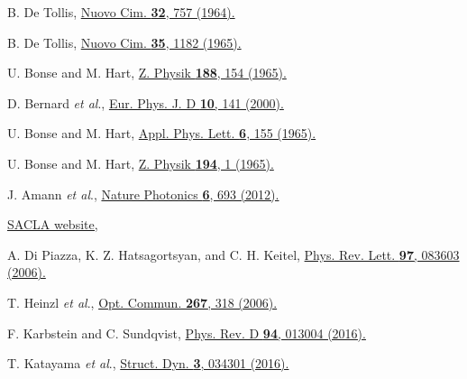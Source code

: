 \documentclass[10pt,a4paper]{article}%
\begin{document}
\begin{thebibliography}{999}
B. De Tollis,
\href{https://doi.org/10.1007/BF02735895}
{Nuovo Cim. {\bf 32}, 757 (1964).}

B. De Tollis,
\href{https://doi.org/10.1007/BF02735534}
{Nuovo Cim. {\bf 35}, 1182 (1965).}

U. Bonse and M. Hart,
\href{https://doi.org/10.1007/BF01339402}
{Z. Physik {\bf 188}, 154 (1965).}

D. Bernard {\it et al}.,
\href{http://doi.org/10.1007/s100530050535}
{Eur. Phys. J. D {\bf 10}, 141 (2000).}

U. Bonse and M. Hart,
\href{https://doi.org/10.1063/1.1754212}
{Appl. Phys. Lett. {\bf 6}, 155 (1965).}

U. Bonse and M. Hart,
\href{https://doi.org/10.1007/BF01326517}
{Z. Physik {\bf 194}, 1 (1965).}

J. Amann {\it et al}.,
\href{https://doi.org/10.1038/nphoton.2012.180}
{Nature Photonics {\bf 6}, 693 (2012).}

\href{http://xfel.riken.jp/eng/index.html}
{SACLA website,}

A. Di Piazza, K. Z. Hatsagortsyan, and C. H. Keitel,
\href{https://doi.org/10.1103/PhysRevLett.97.083603}
{Phys. Rev. Lett. {\bf 97}, 083603 (2006).}

T. Heinzl {\it et al}.,
\href{https://doi.org/10.1016/j.optcom.2006.06.053}
{Opt. Commun. {\bf 267}, 318 (2006).}

F. Karbstein and C. Sundqvist,
\href{https://doi.org/10.1103/PhysRevD.94.013004}
{Phys. Rev. D {\bf 94}, 013004 (2016).}

T. Katayama {\it et al}.,
\href{http://doi.org/10.1063/1.4939655}
{Struct. Dyn. {\bf 3}, 034301 (2016).}


\end{thebibliography}
\end{document}
